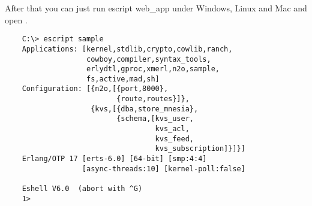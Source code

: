 After that you can just run escript web\_app under Windows, Linux and
Mac and open .

\vspace{1\baselineskip}
\begin{lstlisting}
    C:\> escript sample
    Applications: [kernel,stdlib,crypto,cowlib,ranch,
                   cowboy,compiler,syntax_tools,
                   erlydtl,gproc,xmerl,n2o,sample,
                   fs,active,mad,sh]
    Configuration: [{n2o,[{port,8000},
                          {route,routes}]},
                    {kvs,[{dba,store_mnesia},
                          {schema,[kvs_user,
                                   kvs_acl,
                                   kvs_feed,
                                   kvs_subscription]}]}]
    Erlang/OTP 17 [erts-6.0] [64-bit] [smp:4:4]
                  [async-threads:10] [kernel-poll:false]

    Eshell V6.0  (abort with ^G)
    1>
\end{lstlisting}
\vspace{1\baselineskip}

